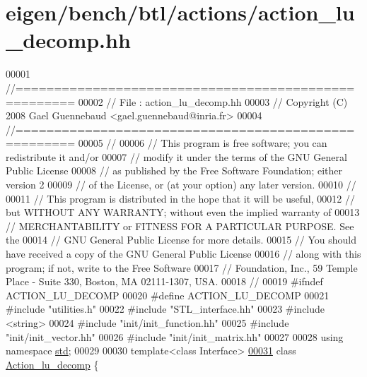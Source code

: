 \hypertarget{eigen_2bench_2btl_2actions_2action__lu__decomp_8hh_source}{}\section{eigen/bench/btl/actions/action\+\_\+lu\+\_\+decomp.hh}
\label{eigen_2bench_2btl_2actions_2action__lu__decomp_8hh_source}

\begin{DoxyCode}
00001 \textcolor{comment}{//=====================================================}
00002 \textcolor{comment}{// File   :  action\_lu\_decomp.hh}
00003 \textcolor{comment}{// Copyright (C) 2008 Gael Guennebaud <gael.guennebaud@inria.fr>}
00004 \textcolor{comment}{//=====================================================}
00005 \textcolor{comment}{//}
00006 \textcolor{comment}{// This program is free software; you can redistribute it and/or}
00007 \textcolor{comment}{// modify it under the terms of the GNU General Public License}
00008 \textcolor{comment}{// as published by the Free Software Foundation; either version 2}
00009 \textcolor{comment}{// of the License, or (at your option) any later version.}
00010 \textcolor{comment}{//}
00011 \textcolor{comment}{// This program is distributed in the hope that it will be useful,}
00012 \textcolor{comment}{// but WITHOUT ANY WARRANTY; without even the implied warranty of}
00013 \textcolor{comment}{// MERCHANTABILITY or FITNESS FOR A PARTICULAR PURPOSE.  See the}
00014 \textcolor{comment}{// GNU General Public License for more details.}
00015 \textcolor{comment}{// You should have received a copy of the GNU General Public License}
00016 \textcolor{comment}{// along with this program; if not, write to the Free Software}
00017 \textcolor{comment}{// Foundation, Inc., 59 Temple Place - Suite 330, Boston, MA  02111-1307, USA.}
00018 \textcolor{comment}{//}
00019 \textcolor{preprocessor}{#ifndef ACTION\_LU\_DECOMP}
00020 \textcolor{preprocessor}{#define ACTION\_LU\_DECOMP}
00021 \textcolor{preprocessor}{#include "utilities.h"}
00022 \textcolor{preprocessor}{#include "STL\_interface.hh"}
00023 \textcolor{preprocessor}{#include <string>}
00024 \textcolor{preprocessor}{#include "init/init\_function.hh"}
00025 \textcolor{preprocessor}{#include "init/init\_vector.hh"}
00026 \textcolor{preprocessor}{#include "init/init\_matrix.hh"}
00027 
00028 \textcolor{keyword}{using namespace }\hyperlink{namespacestd}{std};
00029 
00030 \textcolor{keyword}{template}<\textcolor{keyword}{class} Interface>
\hyperlink{class_action__lu__decomp}{00031} \textcolor{keyword}{class }\hyperlink{class_action__lu__decomp}{Action\_lu\_decomp} \{

\end{DoxyCode}
